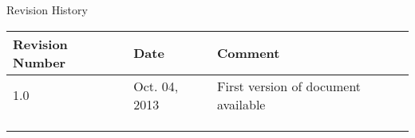 \begin{center}
  {\large Revision History}
  \begin{tabular}{ | l | l | l | }
    \hline
    Revision Number & Date           & Comment \\
    \hline \hline
    1.0             & Oct. 04, 2013  & First version of document available \\ \hline
                    &                & \\ \hline
                    &                & \\ \hline
                    &                & \\ \hline
  \end{tabular}
\end{center}

\newpage
